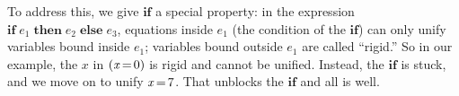 \documentclass[acmsmall]{acmart}
\newcommand{\Varid}[1]{\mathit{#1}}
\begin{document}
To address this, we give \ensuremath{\textbf{if}} a special property: in the expression \ensuremath{\textbf{if}\;\Varid{e}_{\mathrm{1}}\;\textbf{then}\;\Varid{e}_{\mathrm{2}}\;\textbf{else}\;\Varid{e}_{\mathrm{3}}}, equations inside \ensuremath{\Varid{e}_{\mathrm{1}}} (the condition of the \ensuremath{\textbf{if}})
can only unify variables bound inside \ensuremath{\Varid{e}_{\mathrm{1}}}; variables bound outside \ensuremath{\Varid{e}_{\mathrm{1}}} are called ``rigid.''  So in our example, the \ensuremath{\Varid{x}} in \ensuremath{(\Varid{x}\hspace{-0.14em}=\hspace{-0.14em}\mathrm{0})} is
rigid and cannot be unified.  Instead, the \ensuremath{\textbf{if}} is stuck, and we move on to unify \ensuremath{\Varid{x}\hspace{-0.14em}=\hspace{-0.14em}\mathrm{7}}.  That unblocks
the \ensuremath{\textbf{if}} and all is well.
\end{document}
